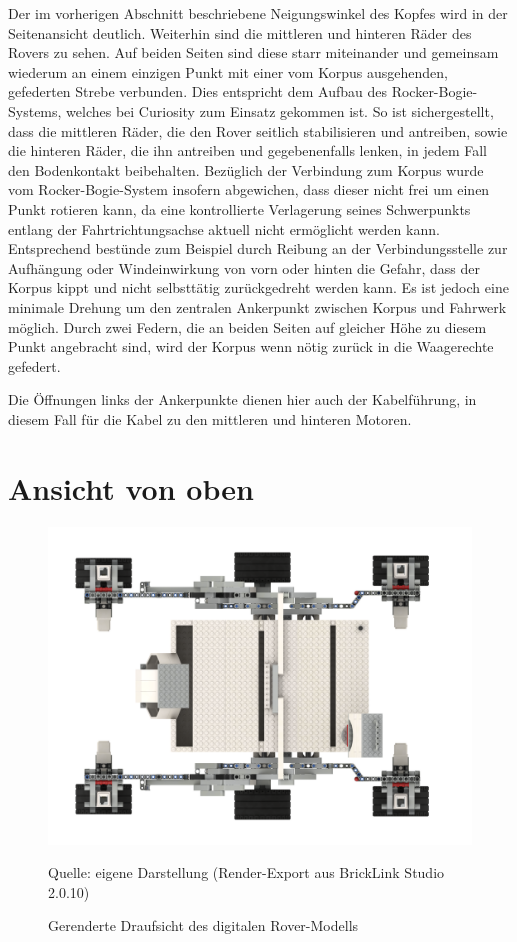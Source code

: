 Der im vorherigen Abschnitt beschriebene Neigungswinkel des Kopfes wird in der Seitenansicht deutlich.
Weiterhin sind die mittleren und hinteren Räder des Rovers zu sehen.
Auf beiden Seiten sind diese starr miteinander und gemeinsam wiederum an einem einzigen Punkt mit einer vom Korpus ausgehenden, gefederten Strebe verbunden.
Dies entspricht dem Aufbau des Rocker-Bogie-Systems, welches bei Curiosity zum Einsatz gekommen ist.
So ist sichergestellt, dass die mittleren Räder, die den Rover seitlich stabilisieren und antreiben, sowie die hinteren Räder, die ihn antreiben und gegebenenfalls lenken, in jedem Fall den Bodenkontakt beibehalten.
Bezüglich der Verbindung zum Korpus wurde vom Rocker-Bogie-System insofern abgewichen, dass dieser nicht frei um einen Punkt rotieren kann, da eine kontrollierte Verlagerung seines Schwerpunkts entlang der Fahrtrichtungsachse aktuell nicht ermöglicht werden kann.
Entsprechend bestünde zum Beispiel durch Reibung an der Verbindungsstelle zur Aufhängung oder Windeinwirkung von vorn oder hinten die Gefahr, dass der Korpus kippt und nicht selbsttätig zurückgedreht werden kann.
Es ist jedoch eine minimale Drehung um den zentralen Ankerpunkt zwischen Korpus und Fahrwerk möglich. 
Durch zwei Federn, die an beiden Seiten auf gleicher Höhe zu diesem Punkt angebracht sind, wird der Korpus wenn nötig zurück in die Waagerechte gefedert.

Die Öffnungen links der Ankerpunkte dienen hier auch der Kabelführung, in diesem Fall für die Kabel zu den mittleren und hinteren Motoren.

\section{Ansicht von oben}
\label{sec:draufsicht}

\begin{figure}
	\centering
	\includegraphics[width=\textwidth]{../Images/20200429_Mars_Rover_V5_top.png}
	\vspace{0.5em}
	\parbox[c]{0.8\linewidth}{\footnotesize
		\centering
		\vspace{1em}
		Quelle: eigene Darstellung (Render-Export aus BrickLink Studio 2.0.10)
	}
	\caption{Gerenderte Draufsicht des digitalen Rover-Modells}
	\label{fig:rovertoprender}
\end{figure}

